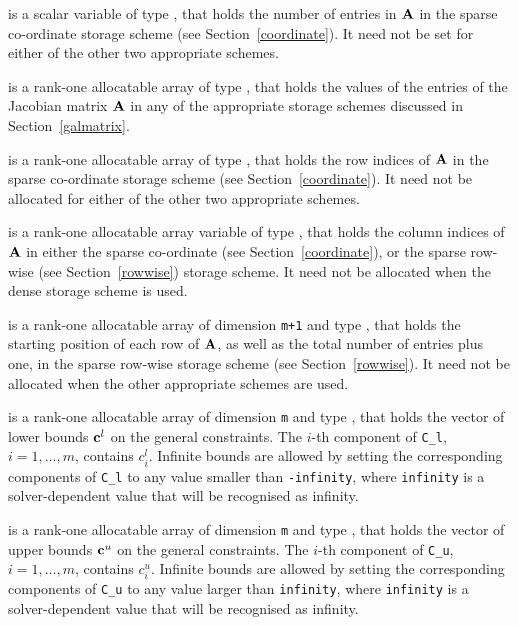 \documentclass{galahad}
\begin{document}
\begin{description}
\begin{description}
 is a scalar variable of type \integer, that
holds the number of entries in ${\mathbf{A}}$
in the sparse co-ordinate storage scheme (see Section~\ref{coordinate}).
It need not be set for either of the other two appropriate schemes.

 is a rank-one allocatable array of type \realdp, that holds
the values of the entries of the Jacobian matrix ${\mathbf{A}}$ in any of the
appropriate storage schemes discussed in Section~\ref{galmatrix}.

 is a rank-one allocatable array of type \integer,
that holds the row indices of ${\mathbf{A}}$ in the sparse co-ordinate storage
scheme (see Section~\ref{coordinate}).
It need not be allocated for either of the other two appropriate schemes.

 is a rank-one allocatable array variable of type \integer,
that holds the column indices of ${\mathbf{A}}$ in either the sparse co-ordinate
(see Section~\ref{coordinate}), or the sparse row-wise
(see Section~\ref{rowwise}) storage scheme.
It need not be allocated when the dense storage scheme is used.

 is a rank-one allocatable array of dimension {\tt m+1} and type
\integer, that holds the
starting position of each row of ${\mathbf{A}}$, as well
as the total number of entries plus one, in the sparse row-wise storage
scheme (see Section~\ref{rowwise}). It need not be allocated when the
other appropriate schemes are used.

\end{description}

 is a rank-one allocatable array of dimension {\tt m} and type
\realdp, that holds the vector of lower bounds ${\mathbf{c}}^{l}$
on the general constraints. The $i$-th component of
{\tt C\_l}, $i = 1, \ldots , m$, contains $c_{i}^{l}$.
Infinite bounds are allowed by setting the corresponding
components of {\tt C\_l} to any value smaller than {\tt -infinity},
where {\tt infinity} is a  solver-dependent value that will be recognised as
infinity.

 is a rank-one allocatable array of dimension {\tt m} and type
\realdp, that holds the vector of upper bounds ${\mathbf{c}}^{u}$
on the general constraints. The $i$-th component of
{\tt C\_u}, $i = 1,  \ldots ,  m$, contains $c_{i}^{u}$.
Infinite bounds are allowed by setting the corresponding
components of {\tt C\_u} to any value larger than {\tt infinity},
where {\tt infinity} is a  solver-dependent value that will be recognised as
infinity.


\end{description}
\end{document}
